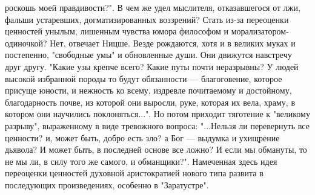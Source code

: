 \documentclass[12pt]{article}
\begin{document}
роскошь  моей  правдивости?".  В  чем  же  удел  мыслителя,  отказавшегося  от  лжи,  фальши  устаревших,
догматизированных  воззрений?  Стать  из-за  переоценки  ценностей  унылым,  лишенным  чувства  юмора
философом и морализатором-одиночкой? Нет, отвечает Ницше. Везде рождаются, хотя и в великих муках и
постепенно, "свободные умы" и обновленные души. Они движутся навстречу друг другу. "Какие узы крепче
всего?  Какие  путы  почти  неразрывны?  У  людей  высокой  избранной  породы  то  будут  обязанности  —
благоговение,  которое  присуще  юности,  и  нежность  ко  всему,  издревле  почитаемому  и  достойному, 
благодарность  почве,  из  которой  они  выросли,  руке,  которая  их  вела,  храму,  в  котором  они  научились
поклоняться...". Но потом приходит тяготение к "великому разрыву", выраженному в виде тревожного вопроса:
"...Нельзя ли перевернуть все ценности? и, может быть, добро есть зло? а Бог — выдумка и ухищрение дьявола?
И может быть, в последней основе все ложно? И если мы обмануты, то не мы ли, в силу того же самого, и
обманщики?". Намеченная здесь идея переоценки ценностей духовной аристократией нового типа развита в
последующих произведениях, особенно в "Заратустре".


\newpage
\end{document}
